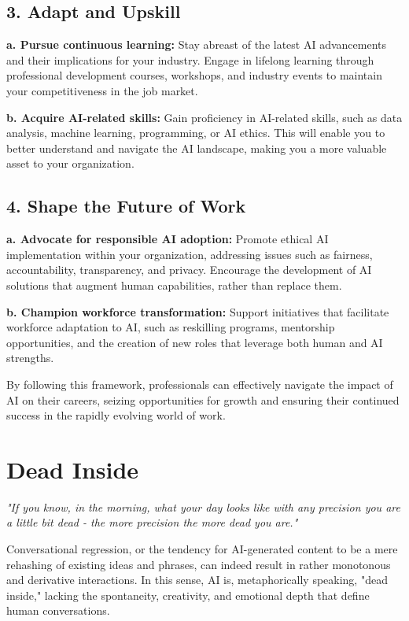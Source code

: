 \subsection{3. Adapt and Upskill}

\textbf{a. Pursue continuous learning:} Stay abreast of the latest AI advancements and their implications for your industry. Engage in lifelong learning through professional development courses, workshops, and industry events to maintain your competitiveness in the job market.

\textbf{b. Acquire AI-related skills:} Gain proficiency in AI-related skills, such as data analysis, machine learning, programming, or AI ethics. This will enable you to better understand and navigate the AI landscape, making you a more valuable asset to your organization.

\subsection{4. Shape the Future of Work}

\textbf{a. Advocate for responsible AI adoption:} Promote ethical AI implementation within your organization, addressing issues such as fairness, accountability, transparency, and privacy. Encourage the development of AI solutions that augment human capabilities, rather than replace them.

\textbf{b. Champion workforce transformation:} Support initiatives that facilitate workforce adaptation to AI, such as reskilling programs, mentorship opportunities, and the creation of new roles that leverage both human and AI strengths.

By following this framework, professionals can effectively navigate the impact of AI on their careers, seizing opportunities for growth and ensuring their continued success in the rapidly evolving world of work.

\section{Dead Inside}

\textit{"If you know, in the morning, what your day looks like with any precision you are a little bit dead - the more precision the more dead you are."}\cite{procrustes}

Conversational regression, or the tendency for AI-generated content to be a mere rehashing of existing ideas and phrases, can indeed result in rather monotonous and derivative interactions. In this sense, AI is, metaphorically speaking, "dead inside," lacking the spontaneity, creativity, and emotional depth that define human conversations.

